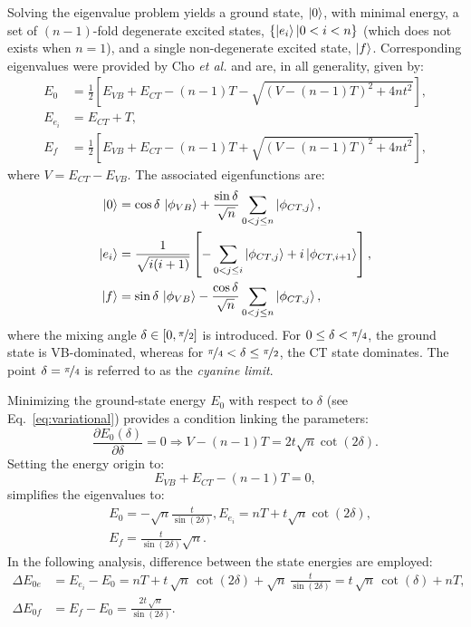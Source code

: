 \documentclass[journal=jpcafh]{achemso}
\begin{document}
Solving the eigenvalue problem yields a ground state, $\ket{0}$, with minimal energy, a set of $(n-1)$-fold degenerate excited states, $\{\ket{e_i} | 0<i< n\}$ (which does not exists when $n=1$), and a single non-degenerate excited state, $\ket{f}$.
Corresponding eigenvalues were provided by Cho \emph{et al.} \cite{choNonlinearOpticalProperties2002} and are, in all generality, given by:
\begin{align}
	E_{0} &= \frac{1}{2} \left[E_{VB} + E_{CT} - (n-1)T - \sqrt{(V - (n-1)T)^2 + 4nt^2}\right], \nonumber\\
	E_{e_i} &= E_{CT} + T, \nonumber\\
	E_{f} &= \frac{1}{2} \left[E_{VB} + E_{CT} - (n-1)T + \sqrt{(V - (n-1)T)^2 + 4nt^2}\right],
\end{align}
where $V = E_{CT} - E_{VB}$. 
The associated eigenfunctions are:
\begin{align}
	\ket{0} &= \cos\delta\,\ket{\phi_{VB}} + \frac{\sin\delta}{\sqrt{n}} \sum_{0<j\leq n} \ket{\phi_{CT,j}},\nonumber\\
	\ket{e_i} &= \frac{1}{\sqrt{i(i+1)}}\left[- \sum_{0<j\leq i} \ket{\phi_{CT,j}} +  i \ket{\phi_{CT,i+1}}\right],\nonumber\\
	\ket{f} &= \sin\delta\,\ket{\phi_{VB}} - \frac{\cos\delta}{\sqrt{n}} \sum_{0<j\leq n} \ket{\phi_{CT,j}},
\end{align}
where the mixing angle $\delta \in [0, \nicefrac{\pi}{2}]$ is introduced. For $0 \leq \delta < \nicefrac{\pi}{4}$, the ground state is VB-dominated, whereas for $\nicefrac{\pi}{4} < \delta \leq \nicefrac{\pi}{2}$, the CT state dominates. The point $\delta = \nicefrac{\pi}{4}$ is referred to as the \textit{cyanine limit}.

Minimizing the ground-state energy $E_0$ with respect to $\delta$ (see Eq.~\eqref{eq:variational})  provides a condition linking the parameters:
\begin{equation}
	\frac{\partial E_0(\delta)}{\partial \delta} = 0 \Rightarrow V - (n-1)T = 2t \sqrt{n} \cot(2\delta). \label{eq:cot}
\end{equation}
Setting the energy origin to:
\begin{equation}
	E_{VB} + E_{CT} - (n-1)T = 0, \label{eq:eorig}
\end{equation}
simplifies the eigenvalues to:
\begin{align}
	&E_{0} = -\sqrt{n} \frac{t}{\sin(2\delta)}, E_{e_i} = nT + t \sqrt{n} \cot(2\delta),\nonumber\\
	&E_{f} =  \frac{t}{\sin(2\delta)}\sqrt{n}.\label{eq:energies}
\end{align}
In the following analysis, difference between the state energies are employed:\begin{align}
	\Delta E_{0e} &= E_{e_i} - E_{0} = nT + t\,\sqrt{n}\,\cot{(2\delta)} + \sqrt{n}\,\frac{t}{\sin{(2\delta)}}  = t\,\sqrt{n}\,\cot(\delta) + nT,\nonumber\\
	\Delta E_{0f} &= E_f - E_0 = \frac{2t\,\sqrt{n}}{\sin(2\delta)}.
\end{align}
\end{document}
